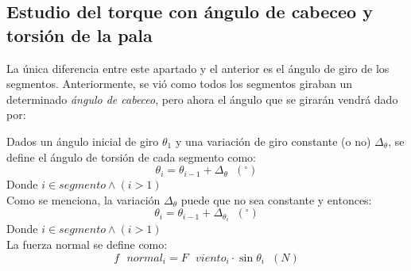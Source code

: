  
 





 
 \subsection{Estudio del torque con ángulo de cabeceo y torsión de la pala}
\label{section:torque_giro_torsion}

La única diferencia entre este apartado y el anterior es el ángulo de giro de los segmentos. Anteriormente, se vió como todos los segmentos giraban un determinado \textit{ángulo de cabeceo}, pero ahora el ángulo que se girarán vendrá dado por:

Dados un ángulo inicial de giro $\theta_1 $ y una variación de giro constante (o no) $\Delta_\theta$, se define el ángulo de torsión de cada segmento como:
\begin{equation}
\theta_i = \theta_{i-1} + \Delta_\theta \hspace{7pt} (^{\circ})
\label{def:theta_cte}
\end{equation}
Donde $i \in segmento \wedge (i > 1)$\\


Como se menciona, la variación $\Delta_\theta$ puede que no sea constante y entonces:
\begin{equation}
\theta_i = \theta_{i-1} + \Delta_{\theta_{i}}  \hspace{7pt} (^{\circ})
\label{def:theta_nocte}
\end{equation}
Donde $i \in segmento \wedge (i > 1)$\\

La fuerza normal se define como:
\begin{equation}
   f \text{ } normal_i = F \text{ } viento_i \cdot \sin{\theta_i} \hspace{7pt} (N)
  \label{def:fuerza_normal_torsion}
 \end{equation}


